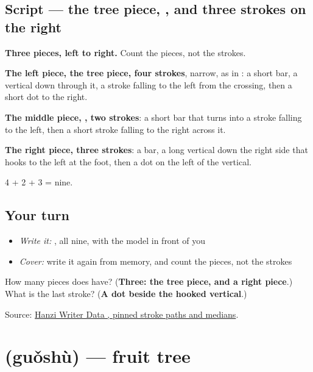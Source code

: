 \subsection*{Script — the tree piece, , and three strokes on the right}

\begin{quote}
\end{quote}

\textbf{Three pieces, left to right.} Count the pieces, not the strokes.

\textbf{The left piece, the tree piece, four strokes}, narrow, as in : a short bar, a vertical down through it, a stroke falling to the left from the crossing, then a short dot to the right.

\textbf{The middle piece, , two strokes}: a short bar that turns into a stroke falling to the left, then a short stroke falling to the right across it.

\textbf{The right piece, three strokes}: a bar, a long vertical down the right side that hooks to the left at the foot, then a dot on the left of the vertical.

4 + 2 + 3 = nine.

\subsection*{Your turn}
\begin{itemize}
\raggedright
  \item \emph{Write it:} , all nine, with the model in front of you
  \item \emph{Cover:} write it again from memory, and count the pieces, not the strokes
\end{itemize}

\begin{tcolorbox}[breakable,colback=teal!4,colframe=teal!35!black,title={Before you move on}]
How many pieces does  have? (\textbf{Three: the tree piece,  and a right piece}.) What is the last stroke? (\textbf{A dot beside the hooked vertical}.)

Source: \href{https://raw.githubusercontent.com/chanind/hanzi-writer-data/68d10a4b21150cae5e1ebbd223eed289cf32d90c/data/\%E6\%A0\%91.json}{Hanzi Writer Data , pinned stroke paths and medians}.
\end{tcolorbox}
\section[\texorpdfstring{\zh{果树} (guǒshù)}{果树 (guǒshù)}]{ (guǒshù) — fruit tree}

